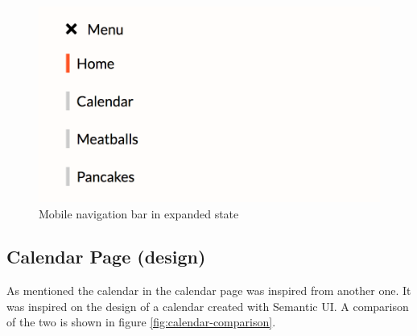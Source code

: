 \documentclass[a4paper]{scrartcl}
\begin{document}
\begin{figure}
	\includegraphics[width=\linewidth]{images/mobile-menu-expanded.png}
	\caption{Mobile navigation bar in expanded state}
	\label{fig:mobile-nav}
\end{figure}

\subsection{Calendar Page (design)}

As mentioned the calendar in the calendar page was inspired from another one. It was inspired on the design of a calendar created with Semantic UI. A comparison of the two is shown in figure \ref{fig:calendar-comparison}.
\end{document}
